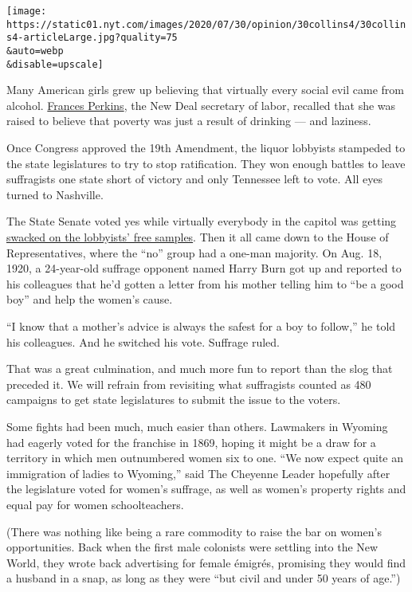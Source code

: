 \texttt{[image: https://static01.nyt.com/images/2020/07/30/opinion/30collins4/30collins4-articleLarge.jpg?quality=75\\\&auto=webp\\\&disable=upscale]}

Many American girls grew up believing that virtually every social evil
came from alcohol.
\href{https://francesperkinscenter.org/life-new/}{Frances Perkins}, the
New Deal secretary of labor, recalled that she was raised to believe
that poverty was just a result of drinking --- and laziness.

Once Congress approved the 19th Amendment, the liquor lobbyists
stampeded to the state legislatures to try to stop ratification. They
won enough battles to leave suffragists one state short of victory and
only Tennessee left to vote. All eyes turned to Nashville.

The State Senate voted yes while virtually everybody in the capitol was
getting
\href{https://www.nytimes.com/2018/03/05/opinion/women-votes-feminism-alcohol.html}{swacked
on the lobbyists' free samples}. Then it all came down to the House of
Representatives, where the ``no'' group had a one-man majority. On Aug.
18, 1920, a 24-year-old suffrage opponent named Harry Burn got up and
reported to his colleagues that he'd gotten a letter from his mother
telling him to ``be a good boy'' and help the women's cause.

``I know that a mother's advice is always the safest for a boy to
follow,'' he told his colleagues. And he switched his vote. Suffrage
ruled.

That was a great culmination, and much more fun to report than the slog
that preceded it. We will refrain from revisiting what suffragists
counted as 480 campaigns to get state legislatures to submit the issue
to the voters.

Some fights had been much, much easier than others. Lawmakers in Wyoming
had eagerly voted for the franchise in 1869, hoping it might be a draw
for a territory in which men outnumbered women six to one. ``We now
expect quite an immigration of ladies to Wyoming,'' said The Cheyenne
Leader hopefully after the legislature voted for women's suffrage, as
well as women's property rights and equal pay for women schoolteachers.

(There was nothing like being a rare commodity to raise the bar on
women's opportunities. Back when the first male colonists were settling
into the New World, they wrote back advertising for female émigrés,
promising they would find a husband in a snap, as long as they were
``but civil and under 50 years of age.'')

